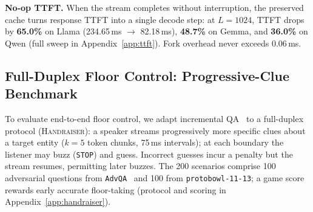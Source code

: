 \documentclass{article}
\begin{document}
\textbf{No-op TTFT.} When the stream completes without interruption, the preserved cache turns response TTFT into a single decode step: at $L{=}1024$, TTFT drops by \textbf{65.0\%} on Llama (234.65\,ms $\to$ 82.18\,ms), \textbf{48.7\%} on Gemma, and \textbf{36.0\%} on Qwen (full sweep in Appendix~\ref{app:ttft}). Fork overhead never exceeds 0.06\,ms.

\subsection{Full-Duplex Floor Control: Progressive-Clue Benchmark}
\label{sec:handraiser}

To evaluate end-to-end floor control, we adapt incremental QA~\citep{rodriguez2021quizbowl} to a full-duplex protocol (\textsc{Handraiser}): a speaker streams progressively more specific clues about a target entity ($k{=}5$ token chunks, 75\,ms intervals); at each boundary the listener may buzz (\texttt{STOP}) and guess. Incorrect guesses incur a penalty but the stream resumes, permitting later buzzes. The 200 scenarios comprise 100 adversarial questions from \texttt{AdvQA}~\citep{wallace2019trick} and 100 from \texttt{protobowl-11-13}; a game score rewards early accurate floor-taking (protocol and scoring in Appendix~\ref{app:handraiser}).

\begin{table}[t]
\centering
\caption{\textbf{\textsc{Handraiser} continuous multi-attempt floor control (200 scenarios, $k{=}5$).} Context re-prefill is cumulative redundant prefix tokens across all attempts per scenario (single-pass baseline is 576.2 tok; Appendix~\ref{app:tokens}).}
\label{tab:handraiser_results}
\renewcommand{\arraystretch}{0.88}
\end{table}
\end{document}
